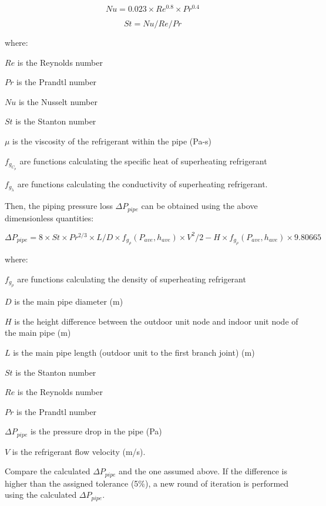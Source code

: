 \begin{equation}
Nu = 0.023\times{Re^{0.8}\times{Pr^{0.4}}}
\end{equation}

\begin{equation}
St = Nu/Re/Pr
\end{equation}

where:

\(Re\) is the Reynolds number

\(Pr\) is the Prandtl number

\(Nu\) is the Nusselt number

\(St\) is the Stanton number

\(\mu\) is the viscosity of the refrigerant within the pipe (Pa-s)

\(f_{g_{C_p}}\) are functions calculating the specific heat of superheating refrigerant

\(f_{g_\lambda}\) are functions calculating the conductivity of superheating refrigerant.

Then, the piping pressure loss \(\Delta{P_{pipe}}\) can be obtained using the above dimensionless quantities:

\begin{equation}
\Delta{P_{pipe}} = 8\times{St}\times{Pr^{2/3}}\times{L/D}\times{f_{g_\rho}(P_{ave},h_{ave})}\times{V^2}/2-H\times{f_{g_\rho}(P_{ave},h_{ave})}\times9.80665
\end{equation}

where:

\(f_{g_\rho}\) are functions calculating the density of superheating refrigerant

\(D\) is the main pipe diameter (m)

\(H\) is the height difference between the outdoor unit node and indoor unit node of the main pipe (m)

\(L\) is the main pipe length (outdoor unit to the first branch joint) (m)

\(St\) is the Stanton number

\(Re\) is the Reynolds number

\(Pr\) is the Prandtl number

\(\Delta{P_{pipe}}\) is the pressure drop in the pipe (Pa)

\(V\) is the refrigerant flow velocity (m/s).

Compare the calculated \(\Delta{P_{pipe}}\) and the one assumed above. If the difference is higher than the assigned tolerance (5\%), a new round of iteration is performed using the calculated \(\Delta{P_{pipe}}\).

